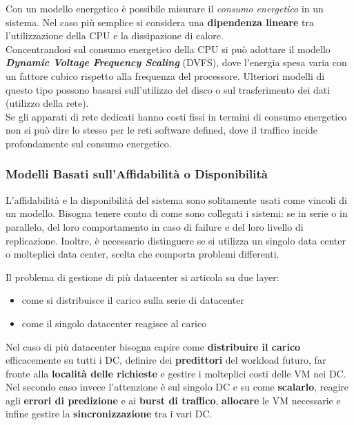 \documentclass{article}
\begin{document}
		Con un modello energetico è possibile misurare il \emph{consumo energetico} in un sistema. Nel caso più semplice si considera una	\textbf{dipendenza lineare} tra l'utilizzazione della CPU e la dissipazione di calore.\\
			
		Concentrandosi sul consumo energetico della CPU si può adottare il modello \textbf{\emph{Dynamic Voltage Frequency Scaling}} (DVFS), dove l'energia spesa varia con un fattore cubico rispetto alla frequenza del processore. Ulteriori modelli di questo tipo possono basarsi sull'utilizzo del disco o sul trasferimento dei dati (utilizzo della rete).\\
		
		Se gli apparati di rete dedicati hanno costi fissi in termini di consumo energetico non si può dire lo stesso per le reti software defined, dove il traffico incide profondamente sul consumo energetico.
		
		\subsubsection{Modelli Basati sull'Affidabilità o Disponibilità}\label{modelli-basati-sullaffidabilituxe0-o-disponibilituxe0}
		
		L'affidabilità e la disponibilità del sistema sono
		solitamente usati come vincoli di un modello. Bisogna
		tenere conto di come sono collegati i sistemi: se in
		serie o in parallelo, del loro comportamento in caso di
		failure e del loro livello di replicazione. Inoltre, è
		necessario distinguere se si utilizza un singolo data
		center o molteplici data center, scelta che comporta
		problemi differenti.
		
		Il problema di gestione di più datacenter si articola su due layer:
		\begin{itemize}
			\item come si distribuisce il carico sulla serie di datacenter
			\item come il singolo datacenter reagisce al carico
		\end{itemize}
		Nel caso di più datacenter bisogna capire come \textbf{distribuire il carico} efficacemente su tutti i DC, definire dei \textbf{predittori} del workload futuro, far fronte alla \textbf{località delle richieste} e gestire i molteplici costi delle VM nei DC.
		Nel secondo caso invece l'attenzione è sul singolo DC e su come \textbf{scalarlo}, reagire agli \textbf{errori di predizione} e ai \textbf{burst di traffico}, \textbf{allocare} le VM necessarie e infine gestire la \textbf{sincronizzazione} tra i vari DC.
		
\end{document}
